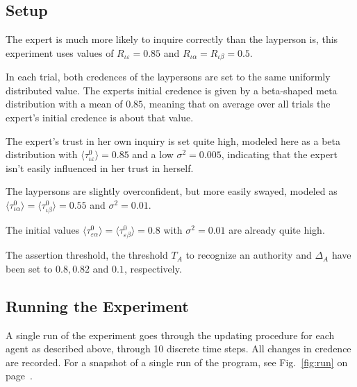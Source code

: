 \documentclass[11pt, a4paper]{article}
\renewcommand{\a}{\alpha}
\begin{document}
\subsection{Setup}
The expert is much more likely to inquire correctly than the layperson is, this experiment uses values of $R_{\iota\varepsilon} = 0.85$ and $R_{\iota\a} = R_{\iota\beta} = 0.5$.

In each trial, both credences of the laypersons are set to the same uniformly distributed value. The experts initial credence is given by a beta-shaped meta distribution with a mean of $ 0.85$, meaning that on average over all trials the expert's initial credence is about that value.

The expert's trust in her own inquiry is set quite high, modeled here as a beta distribution with $\langle \tau^0_{\iota\varepsilon} \rangle = 0.85$ and a low $\sigma^2 = 0.005$, indicating that the expert isn't easily influenced in her trust in herself.

The laypersons are slightly overconfident, but more easily swayed, modeled as $\langle \tau^0_{\iota\a} \rangle =\langle \tau^0_{\iota\beta} \rangle = 0.55$ and $\sigma^2 = 0.01$.

The initial values $\langle \tau^0_{\varepsilon\a} \rangle =\langle \tau^0_{\varepsilon\beta} \rangle = 0.8$ with $\sigma^2 = 0.01$ are already quite high.

The assertion threshold, the threshold $T_A$ to recognize an authority and $\Delta_A$ have been set to $0.8, 0.82$ and $0.1$, respectively.

\subsection{Running the Experiment}

A single run of the experiment goes through the updating procedure for each agent as described above, through 10 discrete time steps. All changes in credence are recorded. For a snapshot of a single run of the program, see Fig.~\ref{fig:run} on page~\pageref{fig:run}.
\end{document}
